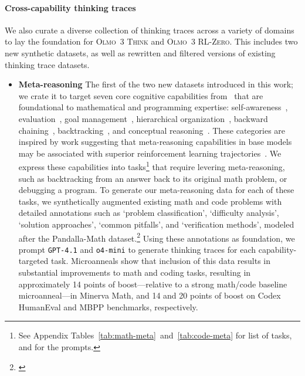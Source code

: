 \documentclass[table]{ai2style/ai2}
\newcommand{\newOlmo}{Olmo\xspace}
\newcommand{\olmothreerlzero}{\textsc{\newOlmo~3 RL-Zero}\xspace}
\newcommand{\olmothreethinking}{\textsc{Olmo~3 Think}\xspace}
\begin{document}
\paragraph{Cross-capability thinking traces}
We also curate a diverse collection of thinking traces across a variety of domains to lay the foundation for \olmothreethinking and \olmothreerlzero. This includes two new synthetic datasets, as well as rewritten and filtered versions of existing thinking trace datasets.
\begin{itemize}
\item {\bf{Meta-reasoning}}
The first of the two new datasets introduced in this work; we crate it to target seven core cognitive capabilities from~\citet{kargupta2025cognitive} that are foundational to mathematical and programming expertise: self-awareness~\citep{toy2024metacognitionneedusingintrospection,bfa322bf36e54a4ca19f9a73bee6184b}, evaluation~\citep{Fleming2017-FLESOD}, goal management~\citep{ACKERMAN2017607,GRIFFITHS201924}, hierarchical organization~\citep{Haupt2018}, backward chaining~\citep{Olieslagers2024}, backtracking~\citep{Joyce2009}, and conceptual reasoning~\citep{Markovits2015}. 
These categories are inspired by work suggesting that meta-reasoning capabilities in base models may be associated with superior reinforcement learning trajectories~\citep{kargupta2025cognitive,gandhi2025cognitive}. 
We express these capabilities into tasks\footnote{See Appendix Tables~\ref{tab:math-meta}~and~\ref{tab:code-meta} for list of tasks, and \href{https://github.com/allenai/dolma3/tree/main/datasets/dolma3_dolmino_mix/meta-reasoning}{} for the prompts.} that require levering meta-reasoning, such as backtracking from an answer back to its original math problem, or debugging a program. 
To generate our meta-reasoning data for each of these tasks, we synthetically augmented existing math \citep{deepscaler2025,moshkov2025aimo2} and code \citep{tacoli,hendrycksapps2021,ahmad2025opencodereasoning} problems with detailed annotations such as `problem classification', `difficulty analysis', `solution approaches', `common pitfalls', and `verification methods', modeled after the Pandalla-Math dataset.\footnote{\href{https://huggingface.co/datasets/pandalla/pandalla-math-dataset-v1.0}{}} 
Using these annotations as foundation, we prompt \texttt{GPT-4.1} and \texttt{o4-mini} to generate thinking traces for each capability-targeted task.
Microanneals show that inclusion of this data results in substantial improvements to math and coding tasks, resulting in approximately 14 points of boost---relative to a strong math/code baseline microanneal---in Minerva Math, and 14 and 20 points of boost on Codex HumanEval and MBPP benchmarks, respectively.


\end{itemize}
\end{document}
